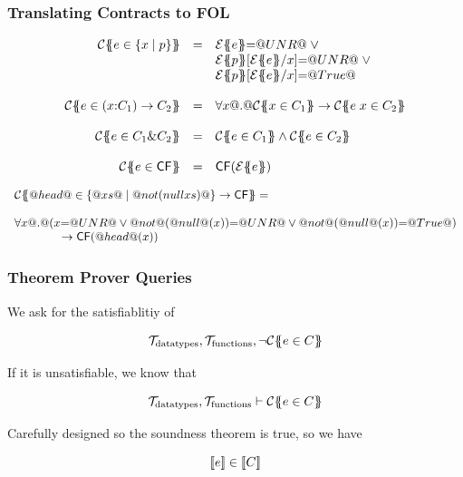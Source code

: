 \documentclass[serif,professionalfont]{beamer}
\begin{document}
\begin{frame}[fragile]
  \frametitle{Translating Contracts to FOL}
  \[\begin{array}{rcl}
  \trc{e \in \{x \mid p \}}
    & = &      \etrans{}{}{e} {=} \unr \; \lor \; \\
    &   &      \etrans{}{}{p}[\etrans{}{}{e}/x] {=} \unr \; \lor \; \\
    &   &      \etrans{}{}{p}[\etrans{}{}{e}/x] {=} \True
  \\ \\
  \trc{e \in (x{:}C_1) \to C_2}
    & = & \formula{\forall x @.@  \trc{x \in C_1} \to \trc{e\;x \in C_2}}
  \\ \\
  \trc{e \in C_1 \& C_2}
     & = & \formula{ \trc{e \in C_1} \land \trc{e \in C_2}}
  \\ \\
  \trc{e \in \cf} & = & \formula{\cf({\etrans{\Sigma}{\Gamma}{e}})} \\
  \end{array}\]

  \[\begin{array}{l}
  {\cal C}\{\!\!\{@head@ \in \{ @xs@ \mid @not (null xs)@ \} \to \mathsf{CF}\}\!\!\} = \\
  \\
  \forall x @.@ (x{=}@UNR@ \lor @not@(@null@(x)){=}@UNR@ \lor @not@(@null@(x)){=}@True@) \\
  \qquad\qquad \to \mathsf{CF}(@head@(x))
  \end{array}\]

\end{frame}

\begin{frame}[fragile]
  \frametitle{Theorem Prover Queries}

  We ask for the satisfiablitiy of

  $$
    \mathcal{T}_{\text{datatypes}}, \mathcal{T}_{\text{functions}} ,
    \neg {\cal C}\{\!\!\{e \in C\}\!\!\}
  $$

  If it is unsatisfiable, we know that

  $$
    \mathcal{T}_{\text{datatypes}}, \mathcal{T}_{\text{functions}} \vdash
    {\cal C}\{\!\!\{e \in C\}\!\!\}
  $$

  Carefully designed so the soundness theorem is true, so we have

  $$
      [\![e]\!] \in [\![C]\!]
  $$


\end{frame}
\end{document}
